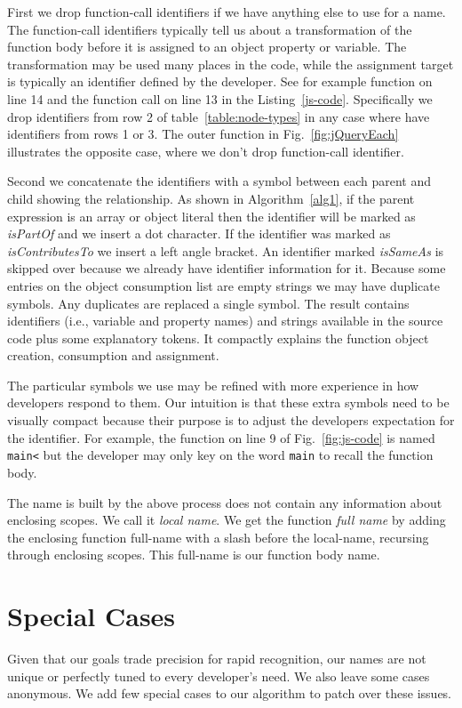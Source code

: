 \documentclass[10pt, preprint]{sigplanconf}
\begin{document}
{First we drop function-call identifiers if we have anything else to use for a name. The function-call identifiers typically tell us about a transformation of the function body before it is assigned to an object property or variable. The transformation may be used many places in the code, while the assignment target is typically an identifier defined by the developer.  See for example function on line 14 and the function call on line 13 in the Listing~\ref{js-code}. Specifically we drop identifiers from row 2 of table~\ref{table:node-types} in any case where have identifiers from rows 1 or 3.  The outer function in Fig.~\ref{fig:jQueryEach} illustrates the opposite case, where we don't drop function-call identifier. 
 
Second we concatenate the identifiers with a symbol between each parent and child showing the relationship.  As shown in Algorithm~\ref{alg1},  
if the parent expression is an array or object literal then the identifier will be marked  as \textit{isPartOf} and we insert a dot character. If the identifier was marked as  \textit{isContributesTo} we insert a left angle bracket. An identifier marked \textit{isSameAs} is skipped over because we already have identifier information for it. Because some entries on the object consumption list are empty strings we may have duplicate symbols. Any duplicates are replaced a single symbol. The result contains identifiers (i.e., variable and property names) and strings available in the source code plus some explanatory tokens. It compactly explains the function object creation, consumption and assignment.
 

The particular symbols we use may be refined with more experience in how developers respond to them. Our intuition is that these extra symbols need to be visually compact because their purpose is to adjust the developers expectation for the identifier. For example, the function on line 9 of Fig.~\ref{fig:js-code} is named \texttt{main<} but the developer may only key on the word \texttt{main} to recall the function body. 

The name is built by the above process does not contain any information about enclosing scopes. We call it \textit{local name}. We get the function \textit{full name} by adding the enclosing function full-name with a slash before the local-name, recursing through enclosing scopes. This full-name is our function body name.

\section{Special Cases}
Given that our goals trade precision for rapid recognition, our names are not unique or perfectly tuned to every developer's need. We also leave some cases anonymous. We add  few special cases to our algorithm to patch over these issues.

}
\end{document}
